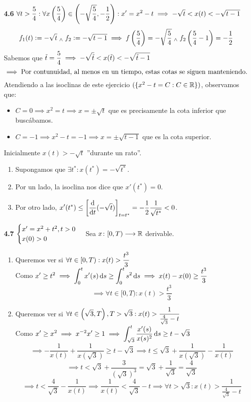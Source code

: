 \textbf{4.6} $\displaystyle \forall t > \frac{5}{4} : \forall x\left(\frac{5}{4}\right) \in \left(-\sqrt{\frac{5}{4}}, -\frac{1}{2}\right) : x'=x^2-t \implies -\sqrt{t} < x(t) < -\sqrt{t-1}$
\[f_1(t)\vcentcolon=-\sqrt{t} \; _{\wedge} \; f_2 \vcentcolon= -\sqrt{t-1} \implies f\left(\frac{5}{4}\right)=-\sqrt{\frac{5}{4}} \; _{\wedge} \; f_2\left(\frac{5}{4} - 1\right)=-\frac{1}{2}\]
Sabemos que $\displaystyle \tilde{t} = \frac{5}{4} \implies -\sqrt{\tilde{t}} < x(\tilde{t}) < -\sqrt{\tilde{t}-1}$
\[\implies \text{Por contunuidad, al menos en un tiempo, estas cotas se siguen manteniendo.}\]
Atendiendo a las isoclinas de este ejercicio $(\{x^2-t=C : C\in \mathbb{R}\})$, observamos que:
\begin{itemize}
	\item $C=0 \implies x^2=t \implies x=\pm\sqrt{t}$ que es precisamente la cota inferior que buscábamos.
	\item $C=-1 \implies x^2-t=-1 \implies x=\pm\sqrt{t-1}$ que es la cota superior.
\end{itemize}
Inicialmente $x(t)>-\sqrt{t}$ ''durante un rato''.
\begin{enumerate}
	\item Supongamos que $\exists t^* : x(t^*)=-\sqrt{t^*}$.
	\item Por un lado, la isoclina nos dice que $x'(t^*)=0$.
	\item Por otro lado, $\ds x'(t^*)\leq \left[\odv{}{t} (-\sqrt{t})\right]_{t=t^*} = -\frac{1}{2}\frac{1}{\sqrt{t^*}}<0$.
\end{enumerate}

\textbf{4.7} $\displaystyle \begin{cases}
	x' = x^2 + t^2, t >0 \\
	x(0)>0
\end{cases}$ Sea $x \colon [0, T) \longrightarrow \mathbb{R}$ derivable.
\begin{enumerate}
	\item Queremos ver si $\displaystyle \forall t \in [0, T) : x(t)> \frac{t^3}{3}$ \\
	Como $\ds x'\geq t^2 \implies \int_{0}^{t} x'(s) \odif{s} \geq \int_{0}^{t} s^2 \odif{s} \implies x(t)-x(0)\geq \frac{t^3}{3}$
	\[\implies \boxed{\forall t \in [0, T) : x(t)>\frac{t^3}{3}}\]
	\item Queremos ver si $\displaystyle \forall t \in \left(\sqrt{3}, T\right), T>\sqrt{3} : x(t)> \frac{1}{\frac{4}{\sqrt{3}}-t}$ \\
	Como $\ds x'\geq x^2 \implies x^{-2}x'\geq 1 \implies \int_{\sqrt{3}}^{t} \frac{x'(s)}{x(s)^2} \odif{s} \geq t-\sqrt{3}$
	\[\implies -\frac{1}{x(t)}+ \frac{1}{x(\sqrt{3})} \geq t-\sqrt{3} \implies t \leq \sqrt{3} +\frac{1}{x(\sqrt{3})}- \frac{1}{x(t)}\]
	\[\implies t< \sqrt{3} + \frac{3}{\left(\sqrt{3}\right)^3} = \sqrt{3} + \frac{1}{\sqrt{3}}=\frac{4}{\sqrt{3}}\]
	\[\implies t < \frac{4}{\sqrt{3}}-\frac{1}{x(t)} \implies \frac{1}{x(t)} < \frac{4}{\sqrt{3}}-t \implies \boxed{\forall t > \sqrt{3} : x(t) > \frac{1}{\frac{4}{\sqrt{3}}-t}}\]
\end{enumerate}